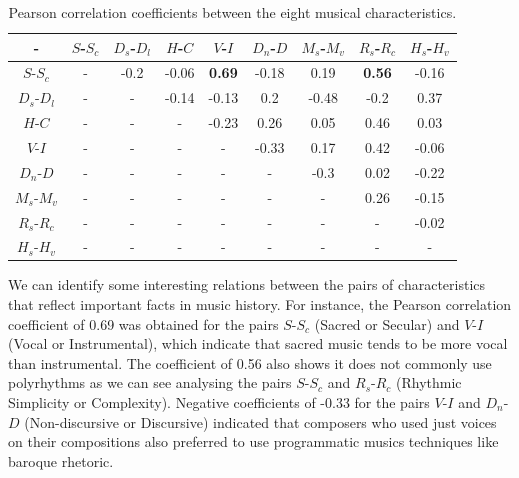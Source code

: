 \documentclass[
 aip,
 jmp,
 amsmath,amssymb,
 reprint,
]{revtex4-1}
\begin{document}
\begin{table}[ht]
\caption{\label{tab:tableB}Pearson correlation coefficients between
  the eight musical characteristics.}

\begin{ruledtabular}
\begin{tabular}{|c||c|c|c|c|c|c|c|c|}

-    & \tiny  $S$-$S_c$ & \tiny  $D_s$-$D_l$ & \tiny  $H$-$C$ & \tiny  $V$-$I$ & \tiny  $D_n$-$D$ & \tiny  $M_s$-$M_v$ & \tiny  $R_s$-$R_c$ & \tiny  $H_s$-$H_v$  \\ \hline
\tiny$S$-$S_c$ & -     &  -0.2 &  -0.06 &  \textbf{0.69}  & -0.18 &  0.19   &  \textbf{0.56} &  -0.16 \\
\tiny$D_s$-$D_l$ & -     &  -     &  -0.14 &  -0.13          &  0.2  &  -0.48  &  -0.2         &  0.37 \\
\tiny$H$-$C$ & -     &  -     &  -     &  -0.23          &  0.26  &  0.05  &  0.46          &  0.03 \\
\tiny$V$-$I$ & -     &  -     &  -     &  -              & -0.33 &  0.17   &  0.42          &  -0.06 \\
\tiny$D_n$-$D$ & -     &  -     &  -     &  -              &  -    &  -0.3  &  0.02          &  -0.22 \\
\tiny$M_s$-$M_v$ & -     &  -     &  -     &  -              &  -    &  -      &  0.26          &  -0.15 \\
\tiny$R_s$-$R_c$ & -     &  -     &  -     &  -              &  -    &  -      &  -             &  -0.02 \\
\tiny$H_s$-$H_v$ & -     &  -     &  -     &  -              &  -    &  -      &  -             &  - \\

\end{tabular}
\end{ruledtabular}
\end{table}

We can identify some interesting relations between the pairs of
characteristics that reflect important facts in music history. For
instance, the Pearson correlation coefficient of 0.69 was obtained for
the pairs $S$-$S_c$ (Sacred or Secular) and $V$-$I$ (Vocal or Instrumental),
which indicate that sacred music tends to be more vocal than
instrumental. The coefficient of 0.56 also shows it does not commonly use polyrhythms as we can see
analysing the pairs $S$-$S_c$ and $R_s$-$R_c$ (Rhythmic Simplicity or Complexity).
Negative coefficients of -0.33 for the pairs $V$-$I$ and $D_n$-$D$
(Non-discursive or Discursive) indicated that composers who used
just voices on their compositions also preferred to use programmatic
musics techniques like baroque rhetoric.
\end{document}
